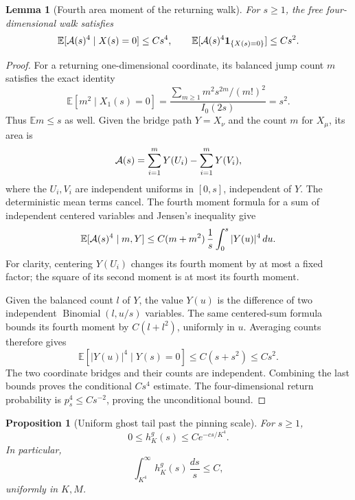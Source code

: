 \documentclass[11pt]{article}
\newtheorem{lemma}[theorem]{Lemma}
\newtheorem{proposition}[theorem]{Proposition}
\theoremstyle{remark}
\begin{document}
\begin{lemma}[Fourth area moment of the returning walk]
\label{pgl-area-fourth}
For \(s\ge1\), the free four-dimensional walk satisfies
\begin{equation}
 \mathbb E[{\cal A}(s)^4\mid X(s)=0]\le Cs^4,\qquad
 \mathbb E[{\cal A}(s)^4{\bf1}_{\{X(s)=0\}}]\le Cs^2.
 \label{pgl-fourth-bound}
\end{equation}
\end{lemma}

\begin{proof}
For a returning one-dimensional coordinate, its
balanced jump count \(m\) satisfies the exact identity
\[
 \mathbb E[m^2\mid X_1(s)=0]
 =\frac{\sum_{m\ge1}m^2s^{2m}/(m!)^2}{I_0(2s)}
 =s^2.
\]
Thus \(\mathbb E m\le s\) as well. Given the bridge
path \(Y=X_\nu\) and the count \(m\) for \(X_\mu\),
its area is
\[
 {\cal A}(s)=\sum_{i=1}^m Y(U_i)-\sum_{i=1}^m Y(V_i),
\]
where the \(U_i,V_i\) are independent uniforms in
\([0,s]\), independent of \(Y\). The deterministic
mean terms cancel. The fourth moment formula for a
sum of independent centered variables and Jensen's
inequality give
\[
 \mathbb E[{\cal A}(s)^4\mid m,Y]
 \le C(m+m^2)\,\frac1s\int_0^s|Y(u)|^4\,du.
\]
For clarity, centering \(Y(U_i)\) changes its fourth
moment by at most a fixed factor; the square of its
second moment is at most its fourth moment.

Given the balanced count \(l\) of \(Y\), the value
\(Y(u)\) is the difference of two independent
\(\operatorname{Binomial}(l,u/s)\) variables.
The same centered-sum formula bounds its fourth
moment by \(C(l+l^2)\), uniformly in \(u\).
Averaging counts therefore gives
\[
 \mathbb E[|Y(u)|^4\mid Y(s)=0]\le C(s+s^2)\le Cs^2.
\]
The two coordinate bridges and their counts are
independent. Combining the last bounds proves
the conditional \(Cs^4\) estimate. The four-dimensional
return probability is \(p_s^4\le Cs^{-2}\), proving
the unconditional bound.
\end{proof}

\begin{proposition}[Uniform ghost tail past the pinning scale]
\label{pgl-tail}
For \(s\ge1\),
\begin{equation}
 0\le h_K^g(s)\le C e^{-c s/K^4}.
 \label{pgl-ghost-tail-pointwise}
\end{equation}
In particular,
\begin{equation}
           \int_{K^4}^\infty h_K^g(s)\,\frac{ds}{s}\le C,
 \label{pgl-tail-integral}
\end{equation}
uniformly in \(K,M\).
\end{proposition}
\end{document}
